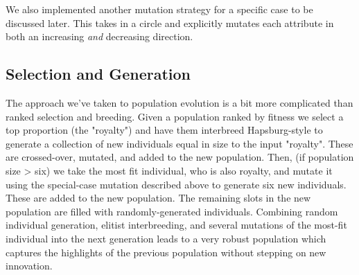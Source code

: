 \documentclass[12pt]{article}
\begin{document}
We also implemented another mutation strategy for a specific case to be discussed later. This takes in a circle and explicitly mutates each attribute in both an increasing \textit{and} decreasing direction.

\subsection*{Selection and Generation}
The approach we've taken to population evolution is a bit more complicated than ranked selection and breeding. Given a population ranked by fitness we select a top proportion (the "royalty") and have them interbreed Hapsburg-style to generate a collection of new individuals equal in size to the input "royalty". These are crossed-over, mutated, and added to the new population. Then, (if population size > six) we take the most fit individual, who is also royalty, and mutate it using the special-case mutation described above to generate six new individuals. These are added to the new population. The remaining slots in the new population are filled with randomly-generated individuals. Combining random individual generation, elitist interbreeding, and several mutations of the most-fit individual into the next generation leads to a very robust population which captures the highlights of the previous population without stepping on new innovation.  
\end{document}
